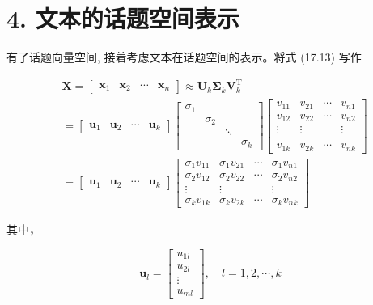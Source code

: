 \documentclass[10pt]{article}
\begin{document}
\section*{4. 文本的话题空间表示}
有了话题向量空间, 接着考虑文本在话题空间的表示。将式 (17.13) 写作

$$
\begin{aligned}
& \boldsymbol{X}=\left[\begin{array}{llll}
\boldsymbol{x}_{1} & \boldsymbol{x}_{2} & \cdots & \boldsymbol{x}_{n}
\end{array}\right] \approx \boldsymbol{U}_{k} \boldsymbol{\Sigma}_{k} \boldsymbol{V}_{k}^{\mathrm{T}} \\
& =\left[\begin{array}{llll}
\boldsymbol{u}_{1} & \boldsymbol{u}_{2} & \cdots & \boldsymbol{u}_{k}
\end{array}\right]\left[\begin{array}{cccc}
\sigma_{1} & & & \\
& \sigma_{2} & & \\
& & \ddots & \\
& & & \sigma_{k}
\end{array}\right]\left[\begin{array}{cccc}
v_{11} & v_{21} & \cdots & v_{n 1} \\
v_{12} & v_{22} & \cdots & v_{n 2} \\
\vdots & \vdots & & \vdots \\
& & & \\
v_{1 k} & v_{2 k} & \cdots & v_{n k}
\end{array}\right] \\
& =\left[\begin{array}{llll}
\boldsymbol{u}_{1} & \boldsymbol{u}_{2} & \cdots & \boldsymbol{u}_{k}
\end{array}\right]\left[\begin{array}{cccc}
\sigma_{1} v_{11} & \sigma_{1} v_{21} & \cdots & \sigma_{1} v_{n 1} \\
\sigma_{2} v_{12} & \sigma_{2} v_{22} & \cdots & \sigma_{2} v_{n 2} \\
\vdots & \vdots & & \vdots \\
\sigma_{k} v_{1 k} & \sigma_{k} v_{2 k} & \cdots & \sigma_{k} v_{n k}
\end{array}\right]
\end{aligned}
$$

其中，

$$
\boldsymbol{u}_{l}=\left[\begin{array}{c}
u_{1 l} \\
u_{2 l} \\
\vdots \\
u_{m l}
\end{array}\right], \quad l=1,2, \cdots, k
$$
\end{document}
